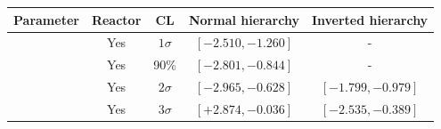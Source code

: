 \begin{tabular}{| c | c | c | c | c |}
\hline
Parameter & Reactor & CL & Normal hierarchy & Inverted hierarchy \\
\hline
\deltacp		& Yes & $ 1\sigma $ & $\left[ -2.510, -1.260 \right]$ & - \\
\deltacp		& Yes & 90\% & $\left[ -2.801, -0.844 \right]$ & - \\
\deltacp		& Yes & $ 2\sigma $ & $\left[ -2.965, -0.628 \right]$ & $\left[ -1.799, -0.979 \right]$ \\
\deltacp		& Yes & $ 3\sigma $ & $\left[ +2.874, -0.036 \right]$ & $\left[ -2.535, -0.389 \right]$ \\
\hline
\end{tabular}

